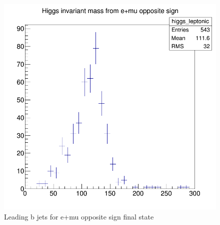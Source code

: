 \documentclass[12pt]{article}
\begin{document}
			  \begin{figure}[h]
			 	\centering
			 	\includegraphics[scale=.31]{e+mu_op.png}
			 	\caption{Leading b jets for e+mu opposite sign final state}
			 \end{figure}
			
	
\end{document}
